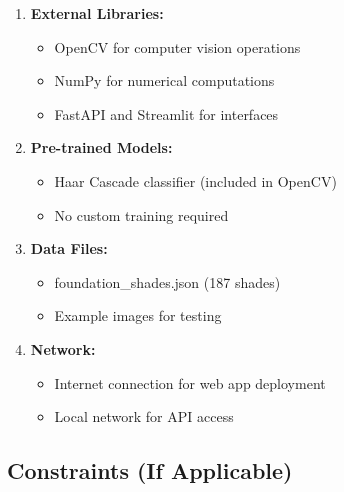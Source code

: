 \begin{enumerate}
    \item \textbf{External Libraries:}
    \begin{itemize}
        \item OpenCV for computer vision operations
        \item NumPy for numerical computations
        \item FastAPI and Streamlit for interfaces
    \end{itemize}
    
    \item \textbf{Pre-trained Models:}
    \begin{itemize}
        \item Haar Cascade classifier (included in OpenCV)
        \item No custom training required
    \end{itemize}
    
    \item \textbf{Data Files:}
    \begin{itemize}
        \item foundation\_shades.json (187 shades)
        \item Example images for testing
    \end{itemize}
    
    \item \textbf{Network:}
    \begin{itemize}
        \item Internet connection for web app deployment
        \item Local network for API access
    \end{itemize}
\end{enumerate}

\subsection{Constraints (If Applicable)}

